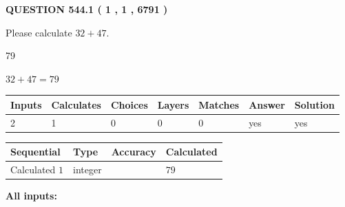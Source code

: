 \documentclass[12pt]{article}
\begin{document}
\vspace{0.2in}
  
{\textbf{\Large{QUESTION
544.1 
 ( 1 , 1 , 6791 )
}}}
  
  
 
Please calculate $ %
32 +  %
47 $.
 
 
 
\noindent{}
 
 

79
 
 
\noindent{}
 
 

 
 
 
\noindent{}
 
 

$ %
32 +  %
47=   %
79$
 
 
\noindent{}
 
 

 
   
   
   
   
\noindent\begin{tabular}{|l|l|l|l|l|l|l|}
 \hline
Inputs & Calculates & Choices & Layers & Matches & Answer & Solution \\ \hline
 2  & 
 1  & 
 0
  & 
 0  & 
 0  & 
  yes & 
  yes 
  \\ \hline
 \end{tabular}
   
   
   
   
\noindent{}
   
   
  
  
\noindent\begin{tabular}{|l|l|l|l|}
\hline
 Sequential & Type & Accuracy & Calculated \\ 
\hline
 
 
  Calculated $  1 $ & integer &  & 
  $ 79 $ 
 \\  \hline  
 \end{tabular}
   
   
   
   
\noindent\vspace{0.1in}\hspace{-0.08in} {\textbf{\Large{All inputs: }}}
   
\end{document}
